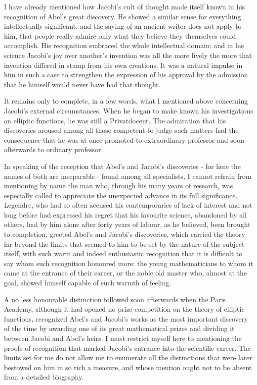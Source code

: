 \documentclass[11pt]{article}
\begin{document}
I have already mentioned how Jacobi's cult of thought made itself known in his recognition of Abel's great discovery. He showed a similar sense for everything intellectually significant, and the saying of an ancient writer does not apply to him, that people really admire only what they believe they themselves could accomplish. His recognition embraced the whole intellectual domain; and in his science Jacobi's joy over another's invention was all the more lively the more that invention differed in stamp from his own creations. It was a natural impulse in him in such a case to strengthen the expression of his approval by the admission that he himself would never have had that thought.

It remains only to complete, in a few words, what I mentioned above concerning Jacobi's external circumstances. When he began to make known his investigations on elliptic functions, he was still a Privatdocent. The admiration that his discoveries aroused among all those competent to judge such matters had the consequence that he was at once promoted to extraordinary professor and soon afterwards to ordinary professor.

In speaking of the reception that Abel's and Jacobi's discoveries - for here the names of both are inseparable - found among all specialists, I cannot refrain from mentioning by name the man who, through his many years of research, was especially called to appreciate the unexpected advance in its full significance. Legendre, who had so often accused his contemporaries of lack of interest and not long before had expressed his regret that his favourite science, abandoned by all others, had by him alone after forty years of labour, as he believed, been brought to completion, greeted Abel's and Jacobi's discoveries, which carried the theory far beyond the limits that seemed to him to be set by the nature of the subject itself, with such warm and indeed enthusiastic recognition that it is difficult to say whom such recognition honoured more: the young mathematicians to whom it came at the entrance of their career, or the noble old master who, almost at the goal, showed himself capable of such warmth of feeling.

A no less honourable distinction followed soon afterwards when the Paris Academy, although it had opened no prize competition on the theory of elliptic functions, recognized Abel's and Jacobi's works as the most important discovery of the time by awarding one of its great mathematical prizes and dividing it between Jacobi and Abel's heirs. I must restrict myself here to mentioning the proofs of recognition that marked Jacobi's entrance into the scientific career. The limits set for me do not allow me to enumerate all the distinctions that were later bestowed on him in so rich a measure, and whose mention ought not to be absent from a detailed biography.
\end{document}
